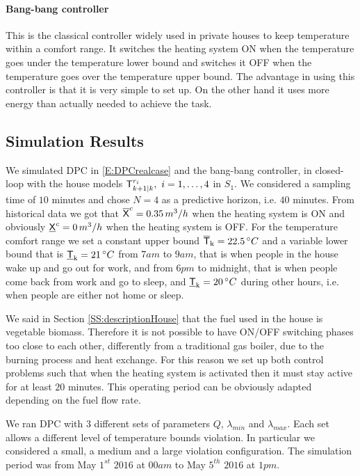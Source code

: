 \paragraph{Bang-bang controller}
This is the classical controller widely used in private houses to keep temperature within a comfort range. It switches the heating system ON when the temperature goes under the temperature lower bound and switches it OFF when the temperature goes over the temperature upper bound. The advantage in using this controller is that it is very simple to set up. On the other hand it uses more energy than actually needed to achieve the task.

\subsection{Simulation Results}\label{SS:simulationResults} We simulated  DPC in \eqref{E:DPCrealcase} and the bang-bang controller, in closed-loop with the house models $\mathsf{T}^{r_i}_{k+1|k},\ i=1,\ldots,4$ in $S_1$. We considered a sampling time of $10$ minutes and chose $N=4$ as a predictive horizon, i.e. $40$ minutes. From historical data we got that $\overline{\mathsf{X}}^c = 0.35 \, m^3/h$ when the heating system is ON and obviously $\underline{\mathsf{X}}^c = 0 \, m^3/h$ when the heating system is OFF. For the temperature comfort range we set a constant upper bound $\overline{\mathsf{T}}_{\mathrm{k}} = 22.5 \, \degree C$ and a variable lower bound that is $\underline{\mathsf{T}}_{\mathrm{k}} = 21 \, \degree C$ from $7am$ to $9am$, that is when people in the house wake up and go out for work, and from $6pm$ to midnight, that is when people come back from work and go to sleep, and $\underline{\mathsf{T}}_{\mathrm{k}} = 20 \, \degree C$ during other hours, i.e. when people are either not home or sleep.

We said in Section \ref{SS:descriptionHouse} that the fuel used in the house is vegetable biomass. Therefore it is not possible to have ON/OFF switching phases too close to each other, differently from a traditional gas boiler, due to the burning process and heat exchange. For this reason we set up both control problems such that when the heating system is activated then it must stay active for at least $20$ minutes. This operating period can be obviously adapted depending on the fuel flow rate.

We ran DPC with $3$ different sets of parameters $Q$, $\lambda_{min}$ and $\lambda_{max}$. Each set allows a different level of temperature bounds violation. In particular we considered a small, a medium and a large violation configuration. The simulation period was from May $1^{st}$ $2016$ at $00am$ to May $5^{th}$ $2016$ at $1pm$.
